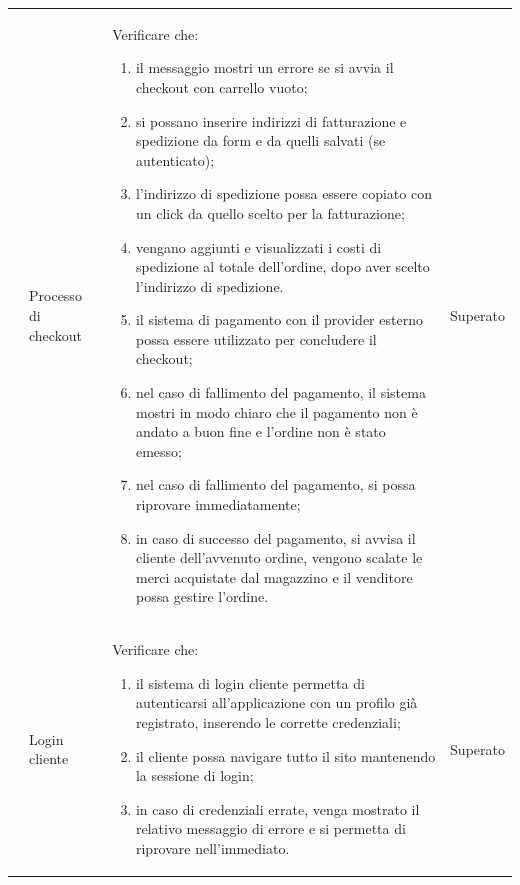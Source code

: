 \begin{center}
\begin{longtable}{|p{0.85cm}|p{2.25cm}|p{9cm}|p{3cm}|}
		 & Processo di checkout & Verificare che:
		\begin{enumerate}
			\item il messaggio mostri un errore se si avvia il checkout con carrello vuoto;
			\item si possano inserire indirizzi di fatturazione e spedizione da form e da quelli salvati (se autenticato);
			\item l'indirizzo di spedizione possa essere copiato con un click da quello scelto per la fatturazione;
			\item vengano aggiunti e visualizzati i costi di spedizione al totale dell'ordine, dopo aver scelto l'indirizzo di spedizione. 
			\item il sistema di pagamento con il provider esterno possa essere utilizzato per concludere il checkout;
			\item nel caso di fallimento del pagamento, il sistema mostri in modo chiaro che il pagamento non è andato a buon fine e l'ordine non è stato emesso;
			\item nel caso di fallimento del pagamento, si possa riprovare immediatamente;
			\item in caso di successo del pagamento, si avvisa il cliente dell'avvenuto ordine, vengono scalate le merci acquistate dal magazzino e il venditore possa gestire l'ordine.
		\end{enumerate} & Superato\\

		 & Login cliente & Verificare che:
		\begin{enumerate}
			\item il sistema di login cliente permetta di autenticarsi all'applicazione con un profilo già registrato, inserendo le corrette credenziali;
			\item il cliente possa navigare tutto il sito mantenendo la sessione di login;
			\item in caso di credenziali errate, venga mostrato il relativo messaggio di errore e si permetta di riprovare nell'immediato.
		\end{enumerate} & Superato\\


\end{longtable}
\end{center}
